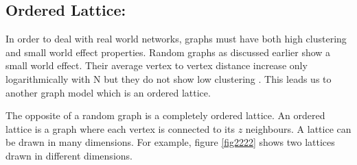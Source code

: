 \subsection{Ordered Lattice:}
In order to deal with real world networks, graphs must have both high clustering and small world effect properties. Random graphs as discussed earlier show a small world effect. Their  average vertex to vertex distance increase only logarithmically with N but they do not show low clustering \citep{newman2000models}. This leads us to another graph model which is an ordered lattice.

The opposite of a random graph is a completely ordered lattice. An ordered lattice is a graph where each vertex is connected to its $z$ neighbours. A lattice can be drawn in many dimensions. For example, figure \ref{fig2222} shows two lattices drawn in different dimensions.
